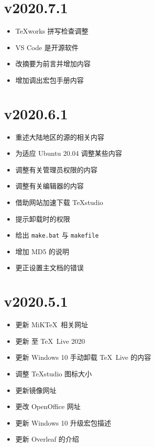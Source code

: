 \section*{v2020.7.1}

\begin{itemize}
  \item \TeX works 拼写检查调整
  \item VS Code 是开源软件
  \item 改摘要为前言并增加内容
  \item 增加调出宏包手册内容
\end{itemize}

\section*{v2020.6.1}

\begin{itemize}
  \item 重述大陆地区的源的相关内容
  \item 为适应 Ubuntu 20.04 调整某些内容
  \item 调整有关管理员权限的内容
  \item 调整有关编辑器的内容
  \item 借助网站加速下载 TeXstudio
  \item 提示卸载时的权限
  \item 给出 \texttt{make.bat} 与 \texttt{makefile}
  \item 增加 MD5 的说明
  \item 更正设置主文档的错误
\end{itemize}

\section*{v2020.5.1}

\begin{itemize}
  \item 更新 MiK\TeX\ 相关网址
  \item 更新 至 \TeX\ Live 2020
  \item 更新 Windows 10 手动卸载 \TeX\ Live 的内容
  \item 调整 \TeX studio 图标大小
  \item 更新镜像网址
  \item 更改 \textsf{OpenOffice} 网址
  \item 更新 Windows 10 升级宏包描述
  \item 更新 Overleaf 的介绍
\end{itemize}

